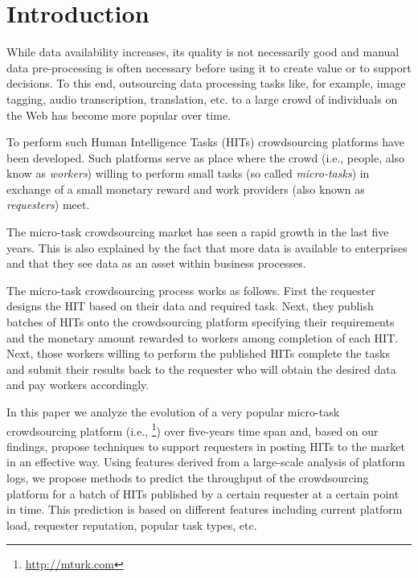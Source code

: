 \section{Introduction}\label{sec:intro}
% 
While data  availability increases, its quality is not necessarily good and manual data pre-processing is often necessary before using it to create value or to support decisions.
% 
To this end, outsourcing  data processing tasks  like, for example, image tagging, audio transcription, translation, etc. to a large crowd of individuals on the Web has become more popular over time.

To perform such Human Intelligence Tasks (HITs) crowdsourcing platforms have been developed. Such platforms serve as place where the crowd (i.e., people, also know as \emph{workers}) willing to perform small tasks (so called \emph{micro-tasks}) in exchange of a small monetary reward and work providers (also known as \emph{requesters}) meet. 

The micro-task crowdsourcing market has seen a rapid growth in the last five years. This is also explained by the fact that more data is available to enterprises and that they see data as an asset within business processes.

The  micro-task crowdsourcing process works as follows. First the requester designs the HIT based on their data and required task. Next, they publish batches of HITs onto the crowdsourcing platform specifying their requirements and the monetary amount rewarded to workers among completion of each HIT. Next, those workers willing to perform the published HITs complete the tasks and submit their results back to the requester who will obtain the desired data and pay workers accordingly.

In this paper we analyze the evolution of a very popular micro-task crowdsourcing platform (i.e., \amt{}\footnote{\url{http://mturk.com}}) over  five-years time span and, based on our findings, propose techniques to support requesters in posting HITs to the market in an effective way.
% 
Using features derived from a large-scale analysis of platform logs, we propose methods to predict the throughput of the crowdsourcing platform for a batch of HITs published by a certain requester at a certain point in time. This prediction is based on different features including current platform load, requester reputation, popular task types, etc.

